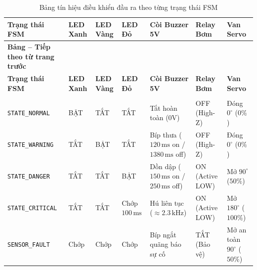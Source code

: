 \begingroup
\small
\renewcommand{\arraystretch}{1.2}
\begin{xltabular}{\textwidth}{|>{\raggedright\arraybackslash}p{2.9cm}|>{\centering\arraybackslash}p{1.1cm}|>{\centering\arraybackslash}p{1.1cm}|>{\centering\arraybackslash}p{1.1cm}|X|>{\centering\arraybackslash}p{2.0cm}|>{\centering\arraybackslash}p{2.0cm}|}
\caption{Bảng tín hiệu điều khiển đầu ra theo từng trạng thái FSM} \label{tab:fsm_outputs} \\
\hline
\textbf{Trạng thái FSM} & \textbf{LED Xanh} & \textbf{LED Vàng} & \textbf{LED Đỏ} & \textbf{Còi Buzzer 5V} & \textbf{Relay Bơm} & \textbf{Van Servo} \\ \hline
\endfirsthead

%
{{\bfseries Bảng \thetable{} -- Tiếp theo từ trang trước}} \\
\hline
\textbf{Trạng thái FSM} & \textbf{LED Xanh} & \textbf{LED Vàng} & \textbf{LED Đỏ} & \textbf{Còi Buzzer 5V} & \textbf{Relay Bơm} & \textbf{Van Servo} \\ \hline
\endhead

\hline {} \\ \hline
\endfoot

\hline
\endlastfoot

\texttt{STATE\_NORMAL} & BẬT & TẮT & TẮT & Tắt hoàn toàn (0V) & OFF (High-Z) & Đóng $0^\circ$ ($0\%$) \\ \hline
\texttt{STATE\_WARNING} & TẮT & BẬT & TẮT & Bíp thưa ($120\,\text{ms}$ on / $1380\,\text{ms}$ off) & OFF (High-Z) & Đóng $0^\circ$ ($0\%$) \\ \hline
\texttt{STATE\_DANGER} & TẮT & TẮT & BẬT & Dồn dập ($150\,\text{ms}$ on / $250\,\text{ms}$ off) & ON (Active LOW) & Mở $90^\circ$ ($50\%$) \\ \hline
\texttt{STATE\_CRITICAL} & TẮT & TẮT & Chớp $100\,\text{ms}$ & Hú liên tục ($\approx 2.3\,\text{kHz}$) & ON (Active LOW) & Mở $180^\circ$ ($100\%$) \\ \hline
\texttt{SENSOR\_FAULT} & Chớp & Chớp & Chớp & Bíp ngắt quãng báo sự cố & TẮT (Bảo vệ) & Mở an toàn $90^\circ$ ($50\%$) \\ \hline
\end{xltabular}
\endgroup

